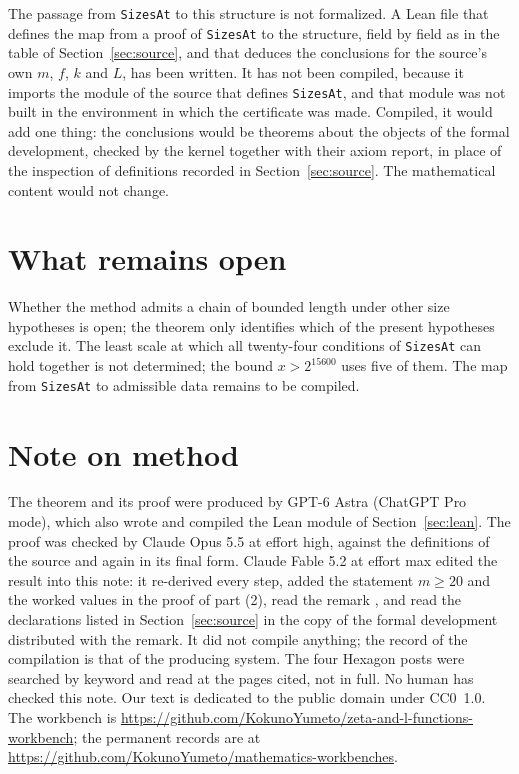 \documentclass[11pt]{amsart}
\newcommand{\workbenchurl}{https://github.com/KokunoYumeto/zeta-and-l-functions-workbench}
\newcommand{\recordurl}{https://github.com/KokunoYumeto/mathematics-workbenches}
\theoremstyle{definition}
\theoremstyle{remark}
\newcommand{\src}[1]{\texttt{#1}}
\begin{document}
The passage from \src{SizesAt} to this structure is not formalized. A Lean file that defines the map from a proof of \src{SizesAt} to the structure, field by field as in the table of Section~\ref{sec:source}, and that deduces the conclusions for the source's own $m$, $f$, $k$ and $L$, has been written. It has not been compiled, because it imports the module of the source that defines \src{SizesAt}, and that module was not built in the environment in which the certificate was made. Compiled, it would add one thing: the conclusions would be theorems about the objects of the formal development, checked by the kernel together with their axiom report, in place of the inspection of definitions recorded in Section~\ref{sec:source}. The mathematical content would not change.

\section{What remains open}

Whether the method admits a chain of bounded length under other size hypotheses is open; the theorem only identifies which of the present hypotheses exclude it. The least scale at which all twenty-four conditions of \src{SizesAt} can hold together is not determined; the bound $x>2^{15600}$ uses five of them. The map from \src{SizesAt} to admissible data remains to be compiled.

\section*{Note on method}
The theorem and its proof were produced by GPT-6 Astra (ChatGPT Pro mode), which also wrote and compiled the Lean module of Section~\ref{sec:lean}. The proof was checked by Claude Opus 5.5 at effort high, against the definitions of the source and again in its final form. Claude Fable 5.2 at effort max edited the result into this note: it re-derived every step, added the statement $m\ge20$ and the worked values in the proof of part (2), read the remark \cite{remark}, and read the declarations listed in Section~\ref{sec:source} in the copy of the formal development distributed with the remark. It did not compile anything; the record of the compilation is that of the producing system. The four Hexagon posts \cite{Jaswal,Zhang,Slijepcevic,Three} were searched by keyword and read at the pages cited, not in full. No human has checked this note. Our text is dedicated to the public domain under CC0~1.0. The workbench is \expandafter\url\expandafter{\workbenchurl}; the permanent records are at \expandafter\url\expandafter{\recordurl}.
\end{document}
